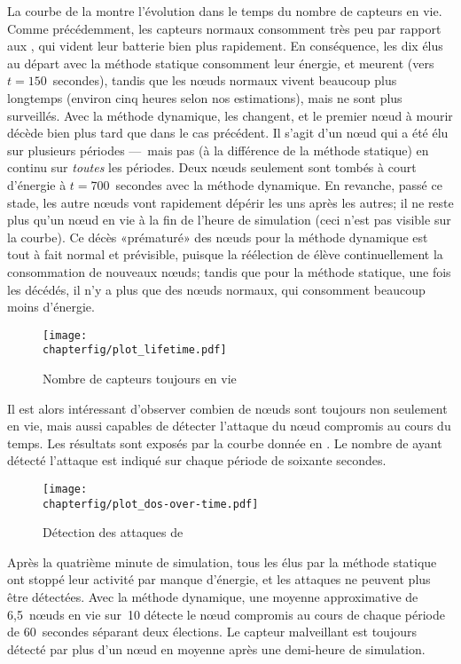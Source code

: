 La courbe de la  montre l'évolution dans le temps du nombre de capteurs en vie.
Comme précédemment, les capteurs normaux consomment très peu par rapport aux \cns, qui vident leur batterie bien plus rapidement.
En conséquence, les dix \cns élus au départ avec la méthode statique consomment leur énergie, et meurent (vers $t=150$~secondes), tandis que les nœuds normaux vivent beaucoup plus longtemps (environ cinq heures selon nos estimations), mais ne sont plus surveillés.
Avec la méthode dynamique, les \cns changent, et le premier nœud à mourir décède bien plus tard que dans le cas précédent.
Il s'agit d'un nœud qui a été élu \cn sur plusieurs périodes ---~mais pas (à la différence de la méthode statique) en continu sur \textit{toutes} les périodes.
Deux nœuds seulement sont tombés à court d'énergie à $t=700$~secondes avec la méthode dynamique.
En revanche, passé ce stade, les autre nœuds vont rapidement dépérir les uns après les autres; il ne reste plus qu'un nœud en vie à la fin de l'heure de simulation (ceci n'est pas visible sur la courbe).
Ce décès «prématuré» des nœuds pour la méthode dynamique est tout à fait normal et prévisible, puisque la réélection de \cns élève continuellement la consommation de nouveaux nœuds; tandis que pour la méthode statique, une fois les \cns décédés, il n'y a plus que des nœuds normaux, qui consomment beaucoup moins d'énergie.
\begin{figure}[ht]
    \centering
    \texttt{[image: \\chapterfig/plot\_lifetime.pdf]}
    \caption{Nombre de capteurs toujours en vie}\label{sa:fig:capteurs-en-vie}
\end{figure}

Il est alors intéressant d'observer combien de nœuds sont toujours non seulement en vie, mais aussi capables de détecter l'attaque du nœud compromis au cours du temps.
Les résultats sont exposés par la courbe donnée en .
Le nombre de \cns ayant détecté l'attaque est indiqué sur chaque période de soixante secondes.
\begin{figure}[ht]
    \centering
    \texttt{[image: \\chapterfig/plot\_dos-over-time.pdf]}
    \caption{Détection des attaques de \dds}\label{sa:fig:detection-dos}
\end{figure}
Après la quatrième minute de simulation, tous les \cns élus par la méthode statique ont stoppé leur activité par manque d'énergie, et les attaques ne peuvent plus être détectées.
Avec la méthode dynamique, une moyenne approximative de 6,5~nœuds en vie sur~10 détecte le nœud compromis au cours de chaque période de 60~secondes séparant deux élections.
Le capteur malveillant est toujours détecté par plus d'un nœud en moyenne après une demi-heure de simulation.
